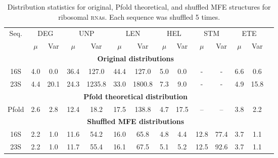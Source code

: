 \documentclass{article}
\newcommand{\RNA}{\textsc{rna}}
\begin{document}
%
%
%
%
%
%
\begin{table}[h]
\centering
\begin{tabular}{cccccccccccccc}
\toprule
\multicolumn{1}{c}{Seq.} 
  & \multicolumn{2}{c}{DEG}
  & \multicolumn{2}{c}{UNP}
  & \multicolumn{2}{c}{LEN}
  & \multicolumn{2}{c}{HEL}
  & \multicolumn{2}{c}{STM}
  & \multicolumn{2}{c}{ETE}\\
  & $\mu$ & Var & $\mu$ & Var &  $\mu$ & Var &  $\mu$ & Var &  $\mu$ & Var &  $\mu$ & Var \\
\cmidrule(l){1-13}

\multicolumn{13}{c}{\textbf{Original distributions}} \\
\cmidrule(l){1-13}

16S & 4.0 & 0.0 & 36.4 & 127.0 & 44.4 & 127.0 & 5.0 & 0.0 & - & - & 6.6 & 0.6 \\
23S & 4.4 & 20.1 & 24.3 & 1235.8 & 33.0 & 1800.8 & 7.3 & 9.0 & - & - & 4.9 & 15.8 \\

\cmidrule(l){1-13}
\multicolumn{13}{c}{\textbf{Pfold theoretical distribution}} \\
\cmidrule(l){1-13}

Pfold & 2.6 & 2.8 & 12.4 & 18.2 & 17.5 & 138.8 & 4.7 & 17.5 & -- & -- & 3.8 & 2.2 \\

\cmidrule(l){1-13}
\multicolumn{13}{c}{\textbf{Shuffled MFE distributions}} \\
\cmidrule(l){1-13}

16S & 2.2 & 1.0 & 11.6 & 54.2 & 16.0 & 65.8 & 4.8 & 4.4 & 12.8 & 77.4 & 3.7 & 1.1 \\
23S & 2.2 & 1.0 & 11.7 & 55.4 & 16.1 & 67.5 & 5.1 & 5.2 & 12.5 & 92.6 & 3.7 & 1.1 \\

\bottomrule
\end{tabular}
\caption{Distribution statistics for original, Pfold theoretical, and shuffled MFE structures for ribosomal \RNA s.  Each sequence was shuffled 5 times.}
\label{table:CRWCombinedStatistics}
\end{table}
%
%
%
%
%
%
%
%
\end{document}
